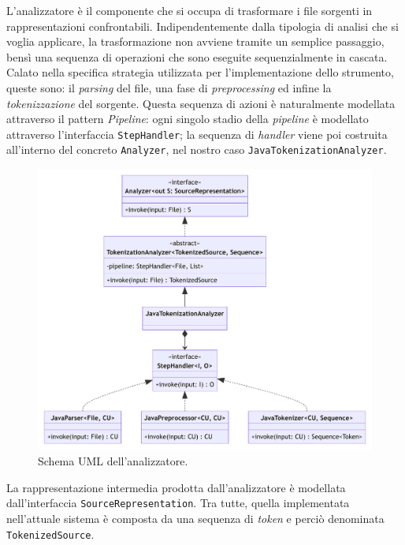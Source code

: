 L'analizzatore è il componente che si occupa di trasformare i file sorgenti in rappresentazioni confrontabili.
%
Indipendentemente dalla tipologia di analisi che si voglia applicare, la trasformazione non avviene tramite un semplice passaggio, bensì una sequenza di operazioni che sono eseguite sequenzialmente in cascata.
%
Calato nella specifica strategia utilizzata per l'implementazione dello strumento, queste sono: il \textit{parsing} del file, una fase di \textit{preprocessing} ed infine la \textit{tokenizzazione} del sorgente.
%
Questa sequenza di azioni è naturalmente modellata attraverso il pattern \textit{Pipeline}: ogni singolo stadio della \textit{pipeline} \cite{pipeline-pattern} è modellato attraverso l'interfaccia \texttt{StepHandler}; la sequenza di \textit{handler} viene poi costruita all'interno del concreto \texttt{Analyzer}, nel nostro caso \texttt{JavaTokenizationAnalyzer}.
%
%

\begin{figure}[h!]
    \centering
    \includegraphics[width=\textwidth]{resources/img/02-analyzer.pdf}
    \caption{Schema UML dell'analizzatore.}
    \label{img:02-analyzer}
\end{figure}

La rappresentazione intermedia prodotta dall'analizzatore è modellata dall'interfaccia \texttt{SourceRepresentation}. 
%
Tra tutte, quella implementata nell'attuale sistema è composta da una sequenza di \textit{token} e perciò denominata \texttt{TokenizedSource}.

